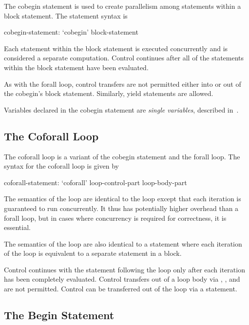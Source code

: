 The cobegin statement is used to create parallelism among statements
within a block statement. The  statement syntax is
\begin{syntax}
cobegin-statement:
  `cobegin' block-statement
\end{syntax}
Each statement within the block statement is executed concurrently and
is considered a separate computation.  Control continues after all of
the statements within the block statement have been evaluated.

As with the forall loop, control transfers are not permitted
either into or out of the cobegin's block statement. Similarly,
yield statements are allowed.

Variables declared in the cobegin statement are {\em single variables},
described in~.

\subsection{The Coforall Loop}
\label{Coforall}

The coforall loop is a variant of the cobegin statement and the forall
loop.  The syntax for the coforall loop is given by
\begin{syntax}
coforall-statement:
   `coforall' loop-control-part loop-body-part
\end{syntax}

The semantics of the  loop are identical to
the  loop except that each iteration is guaranteed to run
concurrently.  It thus has potentially higher overhead than a forall
loop, but in cases where concurrency is required for correctness, it
is essential.

The semantics of the  loop are also identical to
a  statement where each iteration of the 
loop is equivalent to a separate statement in a  block.

Control continues with the statement following the 
loop only after each iteration has been completely evaluated.  Control
transfers out of a loop body via , ,
and  are not permitted.  Control can be transferred out
of the loop via a  statement.

\subsection{The Begin Statement}
\label{Begin}


